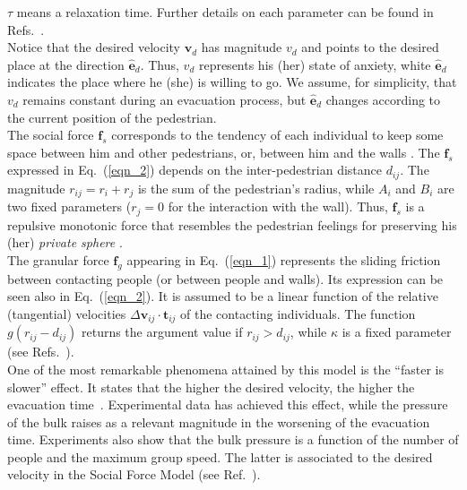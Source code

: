 $\tau$ means a relaxation time. Further details on each parameter can be found 
in Refs.~\cite{Helbing1,Dorso1,Dorso2,Dorso3,Dorso4}.\\

Notice that the desired velocity $\mathbf{v}_d$ has magnitude $v_d$ and points 
to the desired place at the direction $\hat{\mathbf{e}}_d$. Thus, $v_d$ 
represents his (her) state of anxiety, white $\hat{\mathbf{e}}_d$ indicates the 
place where he (she) is willing to go. We assume, for simplicity, that 
$v_d$ remains constant during an evacuation process, but $\hat{\mathbf{e}}_d$ 
changes according to the current position of the pedestrian.   \\

The social force $\mathbf{f}_s$ corresponds to the tendency of each individual 
to keep some space between him and other pedestrians, or, between him and the 
walls \cite{Helbing4}. The $\mathbf{f}_s$ expressed in Eq.~(\ref{eqn_2}) 
depends on the inter-pedestrian distance $d_{ij}$. The magnitude 
$r_{ij}=r_i+r_j$ is the sum of the pedestrian's radius, while $A_i$ and $B_i$ 
are two fixed parameters ($r_j=0$ for the interaction with the wall). Thus, 
$\mathbf{f}_s$ is a repulsive monotonic force that resembles the pedestrian 
feelings for preserving his (her) \textit{private sphere} 
\cite{Helbing1,Helbing4}. \\

The granular force $\mathbf{f}_g$ appearing in Eq.~(\ref{eqn_1}) represents the 
sliding friction between contacting people (or between people  and walls). Its 
expression can be seen also in Eq.~(\ref{eqn_2}). It is assumed to be a linear 
function of the relative (tangential) velocities $\Delta
\mathbf{v}_{ij}\cdot\mathbf{t}_{ij}$ of the contacting individuals. The 
function $g(r_{ij}-d_{ij})$ returns the argument value if $r_{ij}>d_{ij}$, 
while $\kappa$ is a fixed parameter (see 
Refs.~\cite{Helbing1,Dorso1,Dorso2,Dorso3,Dorso4}).\\

{\color{red} One of the most remarkable phenomena attained by this model is the ``faster is slower'' effect. It states that the higher the desired velocity, the higher the evacuation time~\cite{Helbing1}. Experimental data has achieved this effect, while the pressure of the bulk raises as a relevant magnitude in the worsening of the evacuation time. Experiments also show that the bulk pressure is a function of the number  of people and the maximum group speed. The latter is associated to the desired velocity in the Social Force Model (see Ref.~\cite{Pastor}).}  
 


